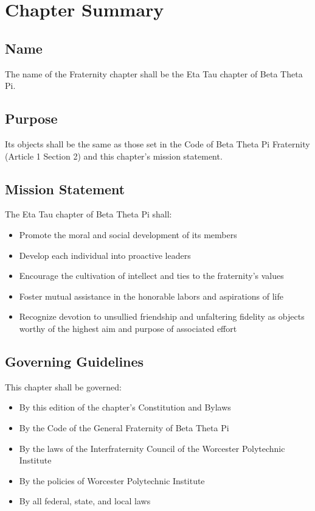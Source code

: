 \chapter{Chapter Summary}
\label{cha:chapter-summary}

\section{Name}
\label{sec:name}

The name of the Fraternity chapter shall be the Eta Tau chapter of Beta Theta
Pi.

\section{Purpose}
\label{sec:purpose}

Its objects shall be the same as those set in the Code of Beta Theta Pi
Fraternity (Article 1 Section 2) and this chapter's mission statement.

\section{Mission Statement}
\label{sec:mission-statement}

The Eta Tau chapter of Beta Theta Pi shall:
\begin{itemize}
	\item Promote the moral and social development of its members
	\item Develop each individual into proactive leaders
	\item Encourage the cultivation of intellect and ties to the fraternity's
		values
	\item Foster mutual assistance in the honorable labors and aspirations of
		life
	\item Recognize devotion to unsullied friendship and unfaltering fidelity as
		objects worthy of the highest aim and purpose of associated effort
\end{itemize}

\section{Governing Guidelines}
\label{sec:governing-guidelines}

This chapter shall be governed:
\begin{itemize}
	\item By this edition of the chapter’s Constitution and Bylaws
	\item By the Code of the General Fraternity of Beta Theta Pi
	\item By the laws of the Interfraternity Council of the Worcester
		Polytechnic Institute
	\item By the policies of Worcester Polytechnic Institute
	\item By all federal, state, and local laws
\end{itemize}
